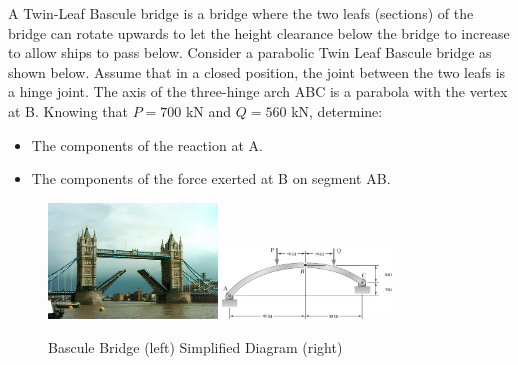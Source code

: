 
A Twin-Leaf Bascule bridge is a bridge where the two leafs (sections) of the bridge can rotate upwards to let
the height clearance below the bridge to increase to allow ships to pass below. Consider a parabolic Twin Leaf
Bascule bridge as shown below. Assume that in a closed position, the joint between the two leafs is a hinge
joint. The axis of the three-hinge arch ABC is a parabola with the vertex at B. Knowing that $P = 700$ kN and
$Q = 560$ kN, determine:
\begin{itemize}
  \item The components of the reaction at A.
  \item The components of the force exerted at B on segment AB.
\end{itemize}

\begin{figure}[ht!]
  \centering
  \includegraphics[width=0.4\textwidth,
	           height=0.3\textheight,
		   keepaspectratio]{figa.png}
  \includegraphics[width=0.4\textwidth,
	           height=0.3\textheight,
		   keepaspectratio]{figb.png}
  \caption*{Bascule Bridge (left) Simplified Diagram (right)}
\end{figure}

